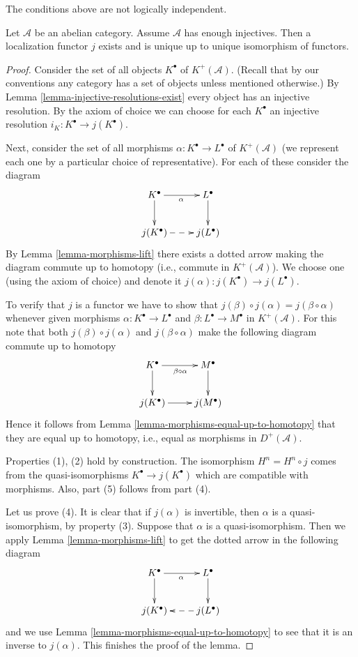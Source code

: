 \noindent
The conditions above are not logically independent.

\begin{lemma}
\label{lemma-into-derived-category}
Let $\mathcal{A}$ be an abelian category.
Assume $\mathcal{A}$ has enough injectives.
Then a localization functor $j$ exists and is 
unique up to unique isomorphism of functors.
\end{lemma}

\begin{proof}
Consider the set of all objects $K^\bullet$ of $K^{+}(\mathcal{A})$.
(Recall that by our conventions any category has a set of
objects unless mentioned otherwise.)
By Lemma \ref{lemma-injective-resolutions-exist} every object
has an injective resolution.
By the axiom of choice we can choose for each $K^\bullet$
an injective resolution $i_K : K^\bullet \to j(K^\bullet)$.

\medskip\noindent
Next, consider the set of all morphisms
$\alpha : K^\bullet \to L^\bullet$
of $K^{+}(\mathcal{A})$ (we represent each one by a
particular choice of representative).
For each of these consider the diagram
$$
\xymatrix{
K^\bullet \ar[d] \ar[r]_\alpha & L^\bullet \ar[d] \\
j(K^\bullet) \ar@{-->}[r] & j(L^\bullet)
}
$$
By Lemma \ref{lemma-morphisms-lift} there exists a dotted arrow
making the diagram commute up to homotopy (i.e., commute in
$K^{+}(\mathcal{A})$). We choose one (using the axiom of choice)
and denote it
$j(\alpha) : j(K^\bullet) \to j(L^\bullet)$.

\medskip\noindent
To verify that $j$ is a functor we have to show that
$j(\beta) \circ j(\alpha) = j(\beta \circ \alpha)$
whenever given morphisms $\alpha : K^\bullet \to L^\bullet$
and $\beta : L^\bullet \to M^\bullet$ in $K^{+}(\mathcal{A})$.
For this note that both
$j(\beta) \circ j(\alpha)$ and $j(\beta \circ \alpha)$
make the following diagram commute up
to homotopy
$$
\xymatrix{
K^\bullet \ar[d] \ar[r]_{\beta \circ \alpha} & M^\bullet \ar[d] \\
j(K^\bullet) \ar[r] & j(M^\bullet)
}
$$
Hence it follows from Lemma \ref{lemma-morphisms-equal-up-to-homotopy}
that they are equal up
to homotopy, i.e., equal as morphisms in $D^{+}(\mathcal{A})$.

\medskip\noindent
Properties (1), (2) hold by construction.
The isomorphism $H^n = H^n \circ j$ comes from the
quasi-isomorphisms $K^\bullet \to j(K^\bullet)$ which
are compatible with morphisms. Also, part (5) follows from part (4).

\medskip\noindent
Let us prove (4). It is clear that if $j(\alpha)$ is invertible,
then $\alpha$ is a quasi-isomorphism, by property (3).
Suppose that $\alpha$ is a quasi-isomorphism. Then we apply
Lemma \ref{lemma-morphisms-lift} to get the dotted arrow
in the following diagram
$$
\xymatrix{
K^\bullet \ar[d] \ar[r]_\alpha & L^\bullet \ar[d] \\
j(K^\bullet) & j(L^\bullet) \ar@{-->}[l]
}
$$
and we use Lemma \ref{lemma-morphisms-equal-up-to-homotopy} to see that
it is an inverse to
$j(\alpha)$. This finishes the proof of the lemma.
\end{proof}

